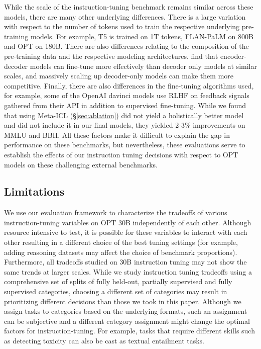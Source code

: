  While the scale of the instruction-tuning benchmark remains similar across these models, there are many other underlying differences. There is a large variation with respect to the number of tokens used to train the respective underlying pre-training models. For example, T5 is trained on 1T tokens, FLAN-PaLM on 800B and OPT on 180B. There are also differences relating to the composition of the pre-training data and the respective modeling architectures. \cite{chowdhery2022palm} find that encoder-decoder models can fine-tune more effectively than decoder only models at similar scales, and massively scaling up decoder-only models can make them more competitive. Finally, there are also differences in the fine-tuning algorithms used, for example, some of the OpenAI davinci models use RLHF \citep{christiano2017deep} on feedback signals gathered from their API in addition to supervised fine-tuning. While we found that using Meta-ICL (\S\ref{sec:ablation}) did not yield a holistically better model and did not include it in our final models, they yielded 2-3\% improvements on MMLU and BBH. All these factors make it difficult to explain the gap in performance on these benchmarks, but nevertheless, these evaluations serve to establish the effects of our instruction tuning decisions with respect to OPT models on these challenging external benchmarks.

 \subsection{Limitations} 
 We use our evaluation framework to characterize the tradeoffs of various instruction-tuning variables on OPT 30B independently of each other. Although resource intensive to test, it is possible for these variables to interact with each other resulting in a different choice of the best tuning settings (for example, adding reasoning datasets may affect the choice of benchmark proportions). Furthermore, all tradeoffs studied on 30B instruction tuning may not show the same trends at larger scales. While we study instruction tuning tradeoffs using a comprehensive set of splits of fully held-out, partially supervised and fully supervised categories, choosing a different set of categories may result in prioritizing different decisions than those we took in this paper. Although we assign tasks to categories based on the underlying formats, such an assignment can be subjective and a different category assignment might change the optimal factors for instruction-tuning. For example, tasks that require different skills such as detecting toxicity can also be cast as textual entailment tasks. 


